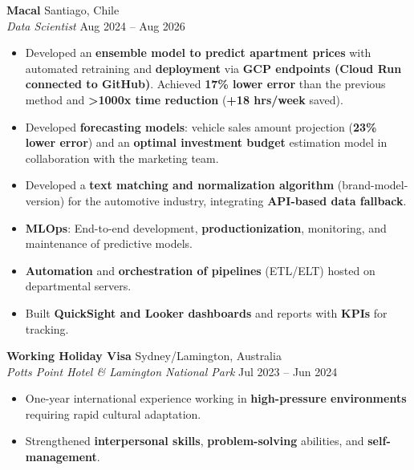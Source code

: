 \documentclass[a4paper,10.5pt]{extarticle}
\begin{document}
\vspace{4pt}

\textbf{Macal} \hfill Santiago, Chile\\
\textit{Data Scientist} \hfill Aug 2024 -- Aug 2026
\begin{itemize}
    \item Developed an \textbf{ensemble model to predict apartment prices} with automated retraining and \textbf{deployment} via \textbf{GCP endpoints (Cloud Run connected to GitHub)}. Achieved \textbf{17\% lower error} than the previous method and \textbf{>1000x time reduction} (\textbf{+18 hrs/week} saved).
    \item Developed \textbf{forecasting models}: vehicle sales amount projection (\textbf{23\% lower error}) and an \textbf{optimal investment budget} estimation model in collaboration with the marketing team.
    \item Developed a \textbf{text matching and normalization algorithm} (brand-model-version) for the automotive industry, integrating \textbf{API-based data fallback}.
    \item \textbf{MLOps}: End-to-end development, \textbf{productionization}, monitoring, and maintenance of predictive models.
    \item \textbf{Automation} and \textbf{orchestration of pipelines} (ETL/ELT) hosted on departmental servers.
    \item Built \textbf{QuickSight and Looker dashboards} and reports with \textbf{KPIs} for tracking.
\end{itemize}

\vspace{4pt}

\textbf{Working Holiday Visa} \hfill Sydney/Lamington, Australia\\
\textit{Potts Point Hotel \& Lamington National Park} \hfill Jul 2023 -- Jun 2024
\begin{itemize}
    \item One-year international experience working in \textbf{high-pressure environments} requiring rapid cultural adaptation.
    \item Strengthened \textbf{interpersonal skills}, \textbf{problem-solving} abilities, and \textbf{self-management}.
\end{itemize}

\vspace{4pt}
\end{document}
